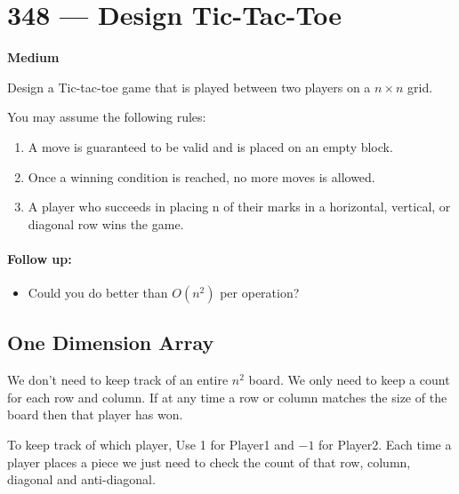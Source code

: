 \section{348 --- Design Tic-Tac-Toe}

\textbf{Medium}

Design a Tic-tac-toe game that is played between two players on a $n \times n$ grid.

You may assume the following rules:

\begin{enumerate}
\item A move is guaranteed to be valid and is placed on an empty block.
\item Once a winning condition is reached, no more moves is allowed.
\item A player who succeeds in placing n of their marks in a horizontal, vertical, or diagonal row wins the game.
\end{enumerate}

\paragraph{Follow up:}
\begin{itemize}
\item Could you do better than $O(n^2)$ per  operation?
\end{itemize}

\subsection{One Dimension Array}
We don't need to keep track of an entire $n^2$ board. We only need to keep a count for each row and column. If at any time a row or column matches the size of the board then that player has won.

To keep track of which player, Use 1 for Player1 and $-1$ for Player2. Each time a player places a piece we just need to check the count of that row, column, diagonal and anti-diagonal.

